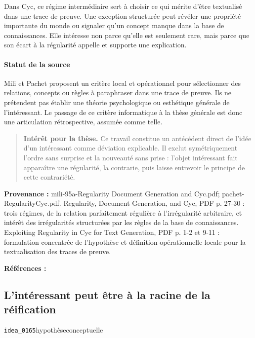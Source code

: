 \documentclass[10pt,a4paper]{article}
\begin{document}
Dans Cyc, ce régime intermédiaire sert à choisir ce qui mérite d'être textualisé dans une trace de preuve. Une exception structurée peut révéler une propriété importante du monde ou signaler qu'un concept manque dans la base de connaissances. Elle intéresse non parce qu'elle est seulement rare, mais parce que son écart à la régularité appelle et supporte une explication.

\paragraph{Statut de la source}
Mili et Pachet proposent un critère local et opérationnel pour sélectionner des relations, concepts ou règles à paraphraser dans une trace de preuve. Ils ne prétendent pas établir une théorie psychologique ou esthétique générale de l'intéressant. Le passage de ce critère informatique à la thèse générale est donc une articulation rétrospective, assumée comme telle.

\begin{quote}
\textbf{Intérêt pour la thèse.} Ce travail constitue un antécédent direct de l'idée d'un intéressant comme déviation explicable. Il exclut symétriquement l'ordre sans surprise et la nouveauté sans prise : l'objet intéressant fait apparaître une régularité, la contrarie, puis laisse entrevoir le principe de cette contrariété.
\end{quote}
{\footnotesize\color{metadata}\textbf{Provenance :} mili-95a-Regularity Document Generation and Cyc.pdf; pachet-RegularityCyc.pdf. Regularity, Document Generation, and Cyc, PDF p. 27-30 : trois régimes, de la relation parfaitement régulière à l'irrégularité arbitraire, et intérêt des irrégularités structurées par les règles de la base de connaissances. Exploiting Regularity in Cyc for Text Generation, PDF p. 1-2 et 9-11 : formulation concentrée de l'hypothèse et définition opérationnelle locale pour la textualisation des traces de preuve.\par}
{\footnotesize\color{metadata}\textbf{Références :} \parencite{milipachet1995regularity}\par}

\subsection{L'intéressant peut être à la racine de la réification}
{\small\color{metadata} \texttt{idea\_0165}\quad\textbullet\quad hypothèse\quad\textbullet\quad conceptuelle\par}
\end{document}
